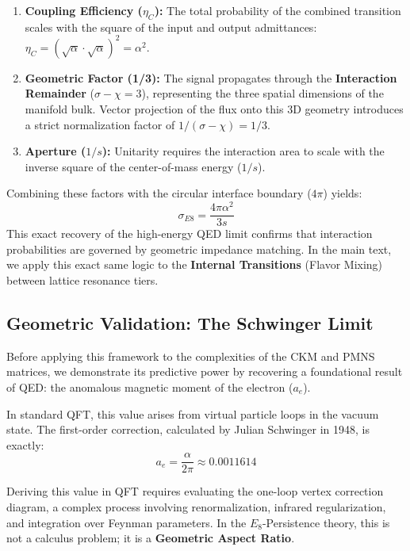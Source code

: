 \begin{enumerate}
    \item \textbf{Coupling Efficiency ($\eta_C$):} The total probability of the combined transition scales with the square of the input and output admittances: $\eta_C = (\sqrt{\alpha} \cdot \sqrt{\alpha})^2 = \alpha^2$.
    \item \textbf{Geometric Factor (1/3):} The signal propagates through the \textbf{Interaction Remainder} ($\sigma - \chi = 3$), representing the three spatial dimensions of the manifold bulk. Vector projection of the flux onto this 3D geometry introduces a strict normalization factor of $1/(\sigma - \chi) = 1/3$.
    \item \textbf{Aperture ($1/s$):} Unitarity requires the interaction area to scale with the inverse square of the center-of-mass energy ($1/s$).
\end{enumerate}

Combining these factors with the circular interface boundary ($4\pi$) yields:
\begin{equation}
\sigma_{E8} = \frac{4\pi \alpha^2}{3s}
\end{equation}
This exact recovery of the high-energy QED limit confirms that interaction probabilities are governed by geometric impedance matching. In the main text, we apply this exact same logic to the \textbf{Internal Transitions} (Flavor Mixing) between lattice resonance tiers.

\subsection{Geometric Validation: The Schwinger Limit}

Before applying this framework to the complexities of the CKM and PMNS matrices, we demonstrate its predictive power by recovering a foundational result of QED: the anomalous magnetic moment of the electron ($a_e$).

In standard QFT, this value arises from virtual particle loops in the vacuum state. The first-order correction, calculated by Julian Schwinger in 1948, is exactly:
\begin{equation}
a_e = \frac{\alpha}{2\pi} \approx 0.0011614
\end{equation}

Deriving this value in QFT requires evaluating the one-loop vertex correction diagram, a complex process involving renormalization, infrared regularization, and integration over Feynman parameters. In the $E_8$-Persistence theory, this is not a calculus problem; it is a \textbf{Geometric Aspect Ratio}.

